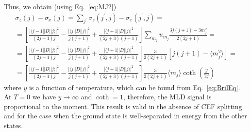 \documentclass[a4paper,oneside,12pt]{extarticle}
\begin{document}
Thus, we obtain (using Eq.~\ref{eq:MJ2})
\begin{multline}
\sigma_z(j) - \sigma_x(j) = \sum_{j^{\prime}} \sigma_z(j^{\prime},j) - \sigma_x(j^{\prime},j) = \\ =
\left[ \frac{|\langle j-1 || D || j \rangle|^2}{(2j-1)j} -
\frac{|\langle j || D || j \rangle|^2}{j(j+1)} +
\frac{|\langle j+1 || D || j \rangle|^2}{(2j+3)(j+1)} \right]
\sum_{m_j} u_{m_j} \frac{3j(j+1)-3m_j^2}{2(2j+1)} = \\ =
\left[ \frac{|\langle j-1 || D || j \rangle|^2}{(2j-1)j} -
\frac{|\langle j || D || j \rangle|^2}{j(j+1)} +
\frac{|\langle j+1 || D || j \rangle|^2}{(2j+3)(j+1)} \right]
\frac{3}{2(2j+1)}\left[j(j+1)-\langle m_j^2 \rangle \right] = \\ =
\left[ \frac{|\langle j-1 || D || j \rangle|^2}{(2j-1)j} -
\frac{|\langle j || D || j \rangle|^2}{j(j+1)} +
\frac{|\langle j+1 || D || j \rangle|^2}{(2j+3)(j+1)} \right]
\frac{3}{2(2j+1)}
\langle m_j \rangle \coth\left(\frac{y}{2j}\right)
\end{multline}
%
where $y$ is a function of temperature, which can be found from Eq.~\ref{eq:BrilEq}. At $T=0$ we have $y\rightarrow\infty$ and $\coth=1$, therefore, the MLD signal is proportional to the moment. This result is valid in the absence of CEF splitting and for the case when the ground state is well-separated in energy from the other states.
%
\end{document}
